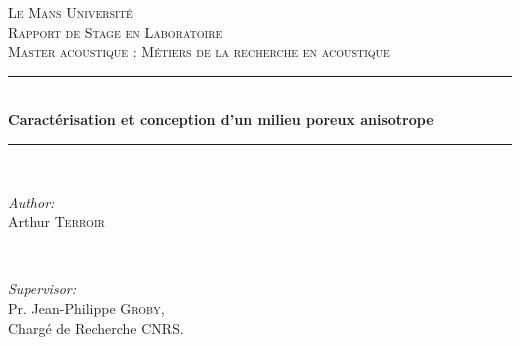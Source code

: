 \documentclass[12pt]{report}
\begin{document}
\begin{titlepage}

\newcommand{\HRule}{\rule{\linewidth}{0.5mm}} %

\center %
 
\textsc{\LARGE Le Mans Université}\\[1.5cm] %
\textsc{\Large Rapport de Stage en Laboratoire}\\[0.5cm] %
\textsc{\large Master acoustique : Métiers de la recherche en acoustique}\\[0.5cm] %


\HRule \\[0.4cm]
{ \huge \bfseries Caractérisation et conception d'un milieu poreux anisotrope}\\[0.4cm] %
\HRule \\[1cm]
 

\begin{minipage}{0.4\textwidth}
\begin{flushleft} \Large
\emph{Author:}\\
Arthur \textsc{Terroir} %
\end{flushleft}
\end{minipage}
~
\begin{minipage}{0.1\textwidth}
\end{minipage}
\begin{minipage}{0.5\textwidth}
\Large{\emph{Supervisor:} \\ Pr. Jean-Philippe \textsc{Groby}},\\
\large Chargé de Recherche CNRS.
\end{minipage}\\[1cm]


\end{titlepage}
\end{document}
